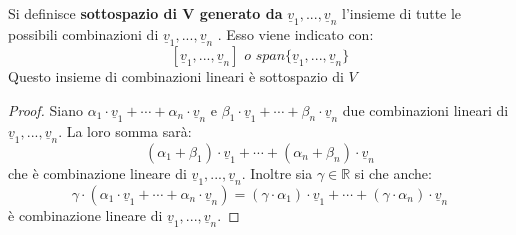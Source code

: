 \documentclass[a4paper,12pt, oneside]{book}
\begin{document}
\begin{definizione}
Si definisce \textbf{sottospazio di V generato da} $\underline{v}_1,...,\underline{v}_n$ l'insieme di tutte le possibili combinazioni di $\underline{v}_1,...,\underline{v}_n$ . Esso viene indicato con:
$$[\underline{v}_1,...,\underline{v}_n]\,\, o\,\, span\{\underline{v}_1,...,\underline{v}_n\}$$
Questo insieme di combinazioni lineari è sottospazio di $V$
\begin{proof}
Siano $\alpha_1\cdot \underline{v}_1+\cdots+\alpha_n\cdot \underline{v}_n$ e $\beta_1\cdot \underline{v}_1+\cdots+\beta_n\cdot \underline{v}_n$ due combinazioni lineari di $\underline{v}_1,...,\underline{v}_n$. La loro somma sarà:
$$(\alpha_1+\beta_1)\cdot\underline{v}_1+\cdots+(\alpha_n+\beta_n)\cdot \underline{v}_n$$
che è combinazione lineare di $\underline{v}_1,...,\underline{v}_n$. Inoltre sia $\gamma\in\mathbb{R}$ si che anche:
$$\gamma\cdot(\alpha_1\cdot \underline{v}_1+\cdots+\alpha_n\cdot \underline{v}_n)=(\gamma\cdot\alpha_1)\cdot \underline{v}_1+\cdots+(\gamma\cdot\alpha_n)\cdot \underline{v}_n$$ 
è combinazione lineare di $\underline{v}_1,...,\underline{v}_n$.
\end{proof}
\end{definizione}
\end{document}
